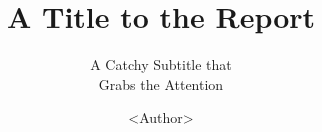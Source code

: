 \documentclass{layout/tudelft-report}
\begin{document}
\frontmatter

\title{A Title to the Report}
\subtitle{A Catchy Subtitle that \\ Grabs the Attention} %
\author{<Author>}
\subject{AE<Number>: <Name>}

\makecover







\tableofcontents


\listoffigures
\listoftables

\mainmatter












\printbibliography[title=References] 

\appendix







\end{document}
